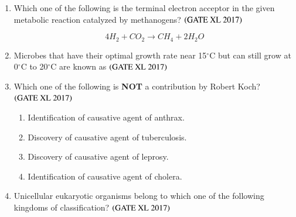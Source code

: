 \documentclass[journal]{IEEEtran}
\begin{document}
\begin{enumerate}
\item Which one of the following is the terminal electron acceptor in the given metabolic reaction catalyzed by methanogens?  \hfill $\left(\text{GATE XL 2017}\right)$

\[
4H_2 + CO_2 \longrightarrow CH_4 + 2H_2O
\]

\begin{enumerate}
\end{enumerate}


\item Microbes that have their optimal growth rate near 15$^\circ$C but can still grow at 0$^\circ$C to 20$^\circ$C are known as  \hfill $\left(\text{GATE XL 2017}\right)$

\begin{enumerate}
\end{enumerate}


\item Which one of the following is \textbf{NOT} a contribution by Robert Koch? \hfill $\left(\text{GATE XL 2017}\right)$ 

\begin{enumerate}
\item Identification of causative agent of anthrax.
\item Discovery of causative agent of tuberculosis.
\item Discovery of causative agent of leprosy.
\item Identification of causative agent of cholera.
\end{enumerate}

\item Unicellular eukaryotic organisms belong to which one of the following kingdoms of classification?  \hfill $\left(\text{GATE XL 2017}\right)$

\begin{enumerate}
\end{enumerate}


\end{enumerate}
\end{document}
